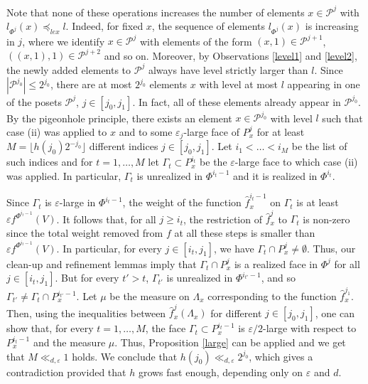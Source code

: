 \documentclass{daj}
\renewcommand{\le}{\leqslant}
\renewcommand{\ge}{\geqslant}
\renewcommand{\P}{\mathcal P}
\theoremstyle{definition}
\theoremstyle{remark}
\theoremstyle{definition}
\theoremstyle{definition}
\begin{document}
Note that none of these operations increases the number of elements $x \in \P^j$ with $l_{\Phi^j}(x) \preceq_{lex} l$. Indeed, for fixed $x$, the sequence of elements $l_{\Phi^j}(x)$ is increasing in $j$, where we identify $x \in \P^j$ with elements of the form $(x, 1) \in \P^{j+1}$, $((x, 1), 1) \in \P^{j+2}$ and so on. Moreover, by Observations \ref{level1} and \ref{level2}, the newly added elements to $\P^j$ always have level strictly larger than $l$.
Since $|\P^{j_0}| \le 2^{j_0}$, there are at most $2^{j_0}$ elements $x$ with level at most $l$ appearing in one of the posets $\P^j$, $j \in [j_0, j_1]$. In fact, all of these elements already appear in $\P^{j_0}$. By the pigeonhole principle, there exists an element $x \in \P^{j_0}$ with level $l$ such that case (ii) was applied to $x$ and to some $\varepsilon_j$-large face of $P_x^j$ for at least $M = \lfloor h(j_0) 2^{-j_0}\rfloor$ different indices $j \in [j_0, j_1]$.
Let $i_1 <  \ldots < i_M$ be the list of such indices and for $t=1, \ldots, M$ let $\Gamma_t \subset P^{i_t}_x$ be the $\varepsilon$-large face to which case (ii) was applied. In particular, $\Gamma_t$ is unrealized in $\Phi^{i_t-1}$ and it is realized in $\Phi^{i_t}$. 

Since $\Gamma_t$ is $\varepsilon$-large in $\Phi^{i_t-1}$, the weight of the function $\hat f_{x}^{i_t-1}$ on $\Gamma_t$ is at least $\varepsilon f^{\Phi^{i_t-1}}(V)$. It follows that, for all $j \ge i_t$, the restriction of  $\hat f_{x}^{j}$ to $\Gamma_t$ is non-zero since the total weight removed from $f$ at all these steps is smaller than $\varepsilon f^{\Phi^{i_t-1}}(V)$. In particular, for every $j \in [i_t, j_1]$, we have $\Gamma_t \cap P^j_x \neq \emptyset$. Thus, our clean-up and refinement lemmas imply that $\Gamma_t \cap P^j_x$ is a realized face in $\Phi^j$ for all $j \in [i_t, j_1]$.
But for every $t' > t$, $\Gamma_{t'}$ is unrealized in $\Phi^{i_{t'}-1}$, and so $\Gamma_{t'} \neq \Gamma_t \cap P_{x}^{i_{t'}-1}$. Let $\mu$ be the measure on $\Lambda_x$ corresponding to the function $\hat f^{j_1}_x$. Then, using the inequalities between $\hat f^j_x(\Lambda_x)$ for different $j\in [j_0, j_1]$, one can show that, for every $t=1, \ldots, M$, the face $\Gamma_t \subset P_x^{i_t-1}$ is $\varepsilon/2$-large with respect to $P_x^{i_t-1}$ and the measure $\mu$. Thus, Proposition \ref{large} can be applied and we get that $M \ll_{d, \varepsilon} 1$ holds. We conclude that $h(j_0) \ll_{d, \varepsilon} 2^{j_0}$, which gives a contradiction provided that $h$ grows fast enough, depending only on $\varepsilon$ and $d$. 
\end{document}

